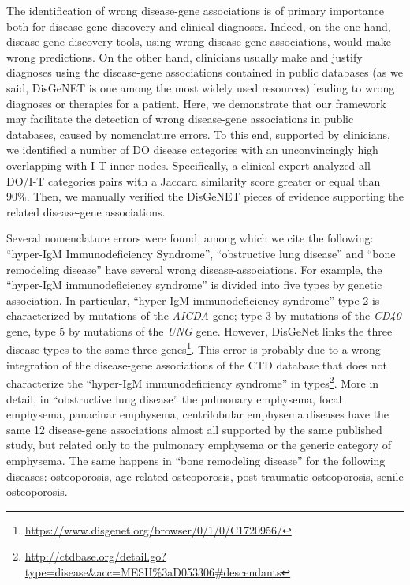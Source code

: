 \documentclass[journal,twoside,web]{ieeecolor}
\begin{document}
The identification of wrong disease-gene associations is of primary importance both for disease gene discovery and clinical diagnoses. Indeed, on the one hand, disease gene discovery tools, using wrong disease-gene associations, would  make wrong predictions. On the other hand, clinicians usually make and justify diagnoses using the disease-gene associations contained in public databases (as we said, DisGeNET is one among the most widely used resources) leading to wrong diagnoses or therapies for a patient. 
Here, we demonstrate that our framework may  facilitate the detection of wrong disease-gene associations in public databases, caused by nomenclature errors. 
To this end, supported by clinicians, we identified a number of DO disease categories with an unconvincingly high overlapping with I-T  inner nodes. Specifically, a clinical expert  analyzed all DO/I-T  categories pairs with a  Jaccard similarity score greater or equal than $90\%$. Then, we manually verified the DisGeNET  pieces of evidence supporting the related disease-gene associations. 

Several nomenclature errors were found, among which we cite the following:
 ``hyper-IgM Immunodeficiency Syndrome'', ``obstructive lung disease''  and  ``bone  remodeling  disease'' have several wrong disease-associations. For example, the ``hyper-IgM immunodeficiency syndrome'' is divided into five types by  genetic association. In particular, ``hyper-IgM immunodeficiency syndrome'' type 2 is characterized by mutations of the \textit{AICDA} gene; type 3 by mutations of the \textit{CD40} gene, type 5 by mutations of the \textit{UNG} gene. However, DisGeNet links the three disease types  to the same three genes\footnote{\url{https://www.disgenet.org/browser/0/1/0/C1720956/}}. This error is probably due to a wrong integration of the disease-gene associations of the CTD database that does not characterize the ``hyper-IgM immunodeficiency syndrome'' in types\footnote{\url{http://ctdbase.org/detail.go?type=disease&acc=MESH\%3aD053306\#descendants}}.  
More in detail, in ``obstructive lung disease'' the pulmonary emphysema, focal emphysema, panacinar emphysema, centrilobular emphysema diseases have the same 12 disease-gene associations almost all supported by the same published study, but related only to the pulmonary emphysema or the generic category of emphysema. The same  happens in ``bone remodeling disease'' for the following diseases: osteoporosis, age-related osteoporosis, post-traumatic osteoporosis, senile osteoporosis. 
\end{document}
